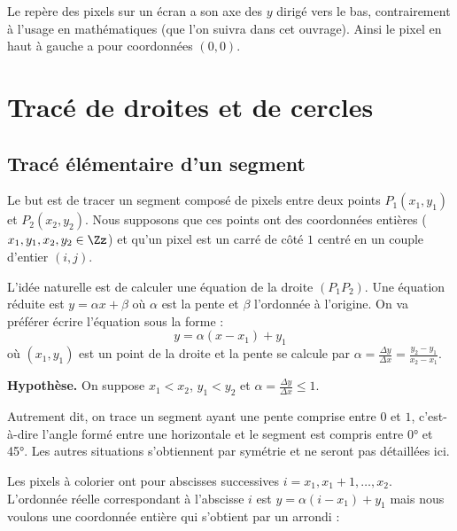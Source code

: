 \documentclass[11pt,class=report,crop=false]{standalone}
\begin{document}
\medskip

Le repère des pixels sur un écran a son axe des \og{}$y$\fg{} dirigé vers le bas, contrairement à l'usage en mathématiques (que l'on suivra dans cet ouvrage).
Ainsi le pixel en haut à gauche a pour coordonnées $(0,0)$.



\section{Tracé de droites et de cercles}

\subsection{Tracé élémentaire d'un segment}

Le but est de tracer un segment composé de pixels entre deux points $P_1(x_1,y_1)$ et $P_2(x_2,y_2)$. Nous supposons que ces points ont des coordonnées entières ($x_1, y_1, x_2, y_2 \in \Zz$) et qu'un pixel est un carré de côté 
$1$ centré en un couple d'entier $(i,j)$.


L'idée naturelle est de calculer une équation de la droite $(P_1P_2)$. Une équation réduite est $y = \alpha x + \beta$ où $\alpha$ est la pente et $\beta$ l'ordonnée à l'origine.
On va préférer écrire l'équation sous la forme :
$$y = \alpha (x-x_1) + y_1$$
où $(x_1,y_1)$ est un point de la droite et la pente se calcule par 
$\alpha = \frac{\Delta y}{\Delta x} = \frac{y_2-y_1}{x_2-x_1}.$

\textbf{Hypothèse.} On suppose $x_1 < x_2$,  $y_1 < y_2$ et $\alpha = \frac{\Delta y}{\Delta x} \le 1$.

Autrement dit, on trace un segment ayant une pente comprise entre $0$ et $1$, c'est-à-dire l'angle formé entre une horizontale et le segment est compris entre \ang{0} et \ang{45}.
Les autres situations s'obtiennent par symétrie et ne seront pas détaillées ici.

Les pixels à colorier ont pour abscisses successives $i=x_1, x_1+1,\ldots,x_2$.
L'ordonnée réelle correspondant à l'abscisse $i$ est $y = \alpha (i-x_1) + y_1$ mais nous voulons une coordonnée entière qui s'obtient par un arrondi :
\end{document}
